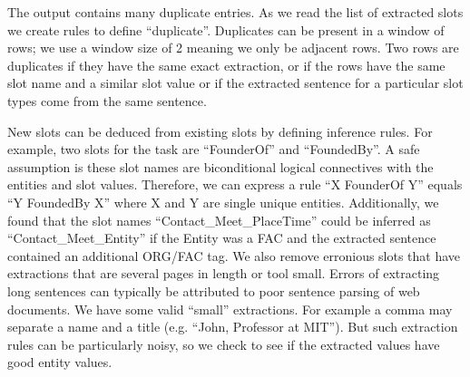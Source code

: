 The output contains many duplicate entries. As we read the list of extracted slots we create rules to define ``duplicate''. Duplicates can be present in a window of rows; we use a window size of 2 meaning we only be adjacent rows. Two rows are duplicates if they have the same exact extraction, or if the rows have the same slot name and a similar slot value or if the extracted sentence for a particular slot types come from the same sentence.

 New slots can be deduced from existing slots by defining inference rules. For example, two slots for the task are ``FounderOf'' and ``FoundedBy''. A safe assumption is these slot names are biconditional logical connectives with the entities and slot values. Therefore, we can express a rule ``X FounderOf Y'' equals ``Y FoundedBy X'' where X and Y are single unique entities. Additionally, we found that the slot names ``Contact\_Meet\_PlaceTime'' could be inferred as ``Contact\_Meet\_Entity'' if the Entity was a FAC and the extracted sentence contained an additional ORG/FAC tag. We also remove erronious slots that have extractions that are several pages in length or tool small. Errors of extracting long sentences can typically be 
attributed to poor sentence parsing of web documents. We have some valid ``small'' extractions. For example a comma may separate a name and a title (e.g. ``John, Professor at MIT''). But such extraction rules can be particularly noisy, so we check to see if the extracted values have good entity values.
